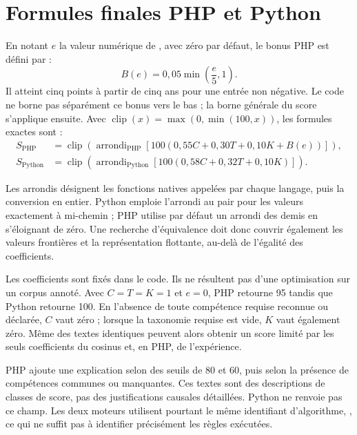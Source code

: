 \section{Formules finales PHP et Python}

En notant $e$ la valeur numérique de , avec zéro par défaut, le bonus PHP est défini par :
\begin{equation}
B(e)=0{,}05\min\left(\frac{e}{5},1\right).
\label{eq:bonus-experience}
\end{equation}
Il atteint cinq points à partir de cinq ans pour une entrée non négative. Le code ne borne pas séparément ce bonus vers le bas ; la borne générale du score s'applique ensuite. Avec $\operatorname{clip}(x)=\max(0,\min(100,x))$, les formules exactes sont :
\begin{align}
S_{\mathrm{PHP}} &= \operatorname{clip}\!\left(
\operatorname{arrondi}_{\mathrm{PHP}}\!\left[
100\left(0{,}55C+0{,}30T+0{,}10K+B(e)\right)\right]\right),
\label{eq:score-php}\\
S_{\mathrm{Python}} &= \operatorname{clip}\!\left(
\operatorname{arrondi}_{\mathrm{Python}}\!\left[
100\left(0{,}58C+0{,}32T+0{,}10K\right)\right]\right).
\label{eq:score-python}
\end{align}

Les arrondis désignent les fonctions natives appelées par chaque langage, puis la conversion en entier. Python emploie l'arrondi au pair pour les valeurs exactement à mi-chemin ; PHP utilise par défaut un arrondi des demis en s'éloignant de zéro. Une recherche d'équivalence doit donc couvrir également les valeurs frontières et la représentation flottante, au-delà de l'égalité des coefficients.

Les coefficients sont fixés dans le code. Ils ne résultent pas d'une optimisation sur un corpus annoté. Avec $C=T=K=1$ et $e=0$, PHP retourne 95 tandis que Python retourne 100. En l'absence de toute compétence requise reconnue ou déclarée, $C$ vaut zéro ; lorsque la taxonomie requise est vide, $K$ vaut également zéro. Même des textes identiques peuvent alors obtenir un score limité par les seuls coefficients du cosinus et, en PHP, de l'expérience.

PHP ajoute une explication selon des seuils de 80 et 60, puis selon la présence de compétences communes ou manquantes. Ces textes sont des descriptions de classes de score, pas des justifications causales détaillées. Python ne renvoie pas ce champ. Les deux moteurs utilisent pourtant le même identifiant d'algorithme, , ce qui ne suffit pas à identifier précisément les règles exécutées.

